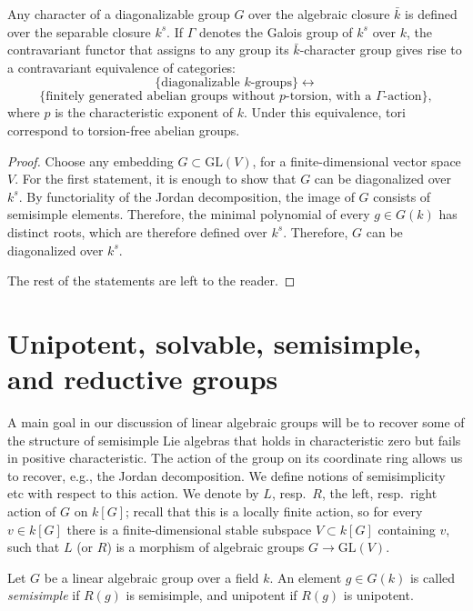 \begin{theorem}
\label{theorem-diagonalizable-equivalence}
Any character of a diagonalizable group $G$ over the algebraic closure $\bar k$ is defined over the separable closure $k^s$. If $\Gamma$ denotes the Galois group of $k^s$ over $k$, the contravariant functor that assigns to any group its $\bar k$-character group gives rise to a contravariant equivalence of categories:
$$\{\mbox{diagonalizable $k$-groups}\} \leftrightarrow $$
$$\{\mbox{finitely generated abelian groups without $p$-torsion, with a $\Gamma$-action}\},$$
where $p$ is the characteristic exponent of $k$.
Under this equivalence, tori correspond to torsion-free abelian groups.
\end{theorem}

\begin{proof}
 Choose any embedding $G\subset \text{GL}(V)$, for a finite-dimensional vector space $V$. For the first statement, it is enough to show that $G$ can be diagonalized over $k^s$. By functoriality of the Jordan decomposition, the image of $G$ consists of semisimple elements. Therefore, the minimal polynomial of every $g\in G(k)$ has distinct roots, which are therefore defined over $k^s$. Therefore, $G$ can be diagonalized over $k^s$.
 
 The rest of the statements are left to the reader.
\end{proof}

\section{Unipotent, solvable, semisimple, and reductive groups}
\label{section-groups}

A main goal in our discussion of linear algebraic groups will be to recover some of the structure of semisimple Lie algebras that holds in characteristic zero but fails in positive characteristic. The action of the group on its coordinate ring allows us to recover, e.g., the Jordan decomposition. We define notions of semisimplicity etc with respect to this action. We denote by $L$, resp.\ $R$, the left, resp.\ right action of $G$ on $k[G]$; recall that this is a locally finite action, so for every $v\in k[G]$ there is a finite-dimensional stable subspace $V\subset k[G]$ containing $v$, such that $L$ (or $R$) is a morphism of algebraic groups $G\to \text{GL}(V)$.

\begin{definition}
\label{definition-semisimple-unipotent-group}
 Let $G$ be a linear algebraic group over a field $k$. An element $g\in G(k)$ is called \emph{semisimple} if $R(g)$ is semisimple, and unipotent if $R(g)$ is unipotent. 
\end{definition}

